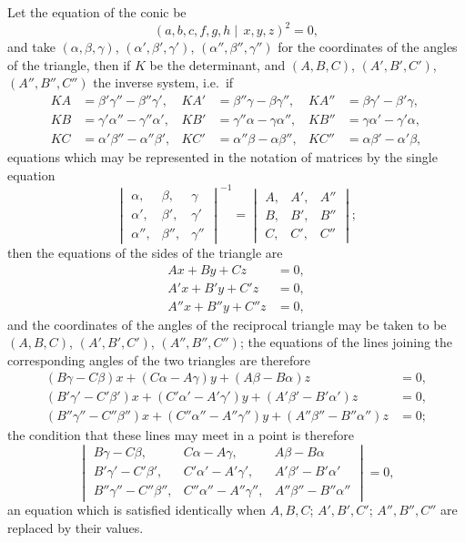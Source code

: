 \documentclass[11pt,a4paper]{book}
\begin{document}
Let the equation of the conic be
\[
(a,b,c,f,g,h \mid\!\, x,y,z)^2 = 0,
\]
and take $(\alpha,\beta,\gamma)$, $(\alpha',\beta',\gamma')$, $(\alpha'',\beta'',\gamma'')$ for the coordinates of the angles of the triangle, then if $K$ be the determinant, and $(A,B,C)$, $(A',B',C')$, $(A'',B'',C'')$ the inverse system, i.e.\ if
\begin{align*}
KA &= \beta'\gamma'' - \beta''\gamma', & KA' &= \beta''\gamma - \beta\gamma'', & KA'' &= \beta\gamma' - \beta'\gamma, \\
KB &= \gamma'\alpha'' - \gamma''\alpha', & KB' &= \gamma''\alpha - \gamma\alpha'', & KB'' &= \gamma\alpha' - \gamma'\alpha, \\
KC &= \alpha'\beta'' - \alpha''\beta', & KC' &= \alpha''\beta - \alpha\beta'', & KC'' &= \alpha\beta' - \alpha'\beta,
\end{align*}
equations which may be represented in the notation of matrices by the single equation
\[
\begin{vmatrix}
\alpha, & \beta, & \gamma \\
\alpha', & \beta', & \gamma' \\
\alpha'', & \beta'', & \gamma''
\end{vmatrix}^{-1}
= \begin{vmatrix}
A, & A', & A'' \\
B, & B', & B'' \\
C, & C', & C''
\end{vmatrix};
\]
then the equations of the sides of the triangle are
\begin{align*}
Ax + By + Cz &= 0, \\
A'x + B'y + C'z &= 0, \\
A''x + B''y + C''z &= 0,
\end{align*}
and the coordinates of the angles of the reciprocal triangle may be taken to be $(A,B,C)$, $(A',B',C')$, $(A'',B'',C'')$; the equations of the lines joining the corresponding angles of the two triangles are therefore
\begin{align*}
(B\gamma - C\beta)x + (C\alpha - A\gamma)y + (A\beta - B\alpha)z &= 0, \\
(B'\gamma' - C'\beta')x + (C'\alpha' - A'\gamma')y + (A'\beta' - B'\alpha')z &= 0, \\
(B''\gamma'' - C''\beta'')x + (C''\alpha'' - A''\gamma'')y + (A''\beta'' - B''\alpha'')z &= 0;
\end{align*}
the condition that these lines may meet in a point is therefore
\[
\begin{vmatrix}
B\gamma - C\beta, & C\alpha - A\gamma, & A\beta - B\alpha \\
B'\gamma' - C'\beta', & C'\alpha' - A'\gamma', & A'\beta' - B'\alpha' \\
B''\gamma'' - C''\beta'', & C''\alpha'' - A''\gamma'', & A''\beta'' - B''\alpha''
\end{vmatrix}
= 0,
\]
an equation which is satisfied identically when $A,B,C$; $A',B',C'$; $A'',B'',C''$ are replaced by their values.
\end{document}
